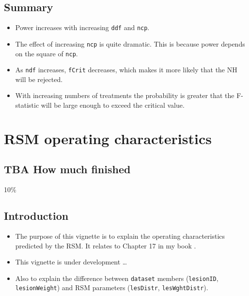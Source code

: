\documentclass[
]{book}
\providecommand{\tightlist}{%
  \setlength{\itemsep}{0pt}\setlength{\parskip}{0pt}}
\begin{document}
\hypertarget{summary-1}{%
\section{Summary}\label{summary-1}}

\begin{itemize}
\tightlist
\item
  Power increases with increasing \texttt{ddf} and \texttt{ncp}.
\item
  The effect of increasing \texttt{ncp} is quite dramatic. This is because power depends on the square of \texttt{ncp}.
\item
  As \texttt{ndf} increases, \texttt{fCrit} decreases, which makes it more likely that the NH will be rejected.
\item
  With increasing numbers of treatments the probability is greater that the F-statistic will be large enough to exceed the critical value.
\end{itemize}

\hypertarget{rsm-operating-characteristics}{%
\chapter{RSM operating characteristics}\label{rsm-operating-characteristics}}

\hypertarget{rsm-operating-characteristics-how-much-finished}{%
\section{TBA How much finished}\label{rsm-operating-characteristics-how-much-finished}}

10\%

\hypertarget{introduction-2}{%
\section{Introduction}\label{introduction-2}}

\begin{itemize}
\tightlist
\item
  The purpose of this vignette is to explain the operating characteristics predicted by the RSM. It relates to Chapter 17 in my book \citep{chakraborty2017observer}.
\item
  This vignette is under development \ldots{}
\item
  Also to explain the difference between \texttt{dataset} members (\texttt{lesionID}, \texttt{lesionWeight}) and RSM parameters (\texttt{lesDistr}, \texttt{lesWghtDistr}).
\end{itemize}
\end{document}
